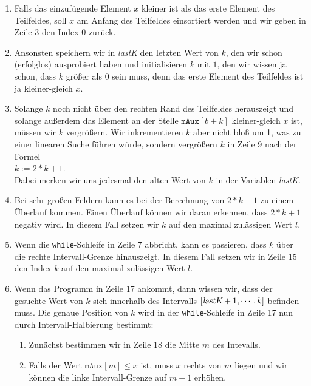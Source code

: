 \begin{enumerate}
\item Falls das einzuf\"ugende Element $x$ kleiner ist als das erste Element des Teilfeldes,
      soll $x$ am Anfang des Teilfeldes einsortiert werden und wir geben in Zeile
      3 den Index 0 zur\"uck.
\item Ansonsten speichern wir in \textsl{lastK} den letzten Wert von $k$, den wir schon
      (erfolglos) ausprobiert haben und initialisieren $k$ mit $1$, den wir wissen ja schon,
      dass $k$ gr\"o{\ss}er als $0$ sein muss, denn das erste Element des Teilfeldes ist ja kleiner-gleich
      $x$.
\item Solange $k$ noch nicht \"uber den rechten Rand des Teilfeldes herauszeigt und solange au{\ss}erdem
      das Element an der Stelle $\mathtt{mAux}[b + k]$ kleiner-gleich $x$ ist, m\"ussen wir $k$ vergr\"o{\ss}ern.
      Wir inkrementieren $k$ aber nicht blo{\ss} um 1, was zu einer linearen Suche f\"uhren w\"urde, sondern
      vergr\"o{\ss}ern $k$ in Zeile 9 nach der Formel
      \\[0.2cm]
      \hspace*{1.3cm}
      $k := 2 * k + 1$.
      \\[0.2cm]
      Dabei merken wir uns jedesmal den alten Wert von $k$ in der Variablen \textsl{lastK}.
\item Bei sehr gro{\ss}en Feldern kann es bei der Berechnung von $2 * k + 1$ zu einem
      Überlauf kommen.  Einen Überlauf k\"onnen wir daran erkennen, dass $2 * k + 1$ negativ wird.
      In diesem Fall setzen wir $k$ auf den maximal zul\"assigen Wert $l$.
\item Wenn die \texttt{while}-Schleife in Zeile 7 abbricht, kann es passieren, dass $k$ \"uber die
      rechte Intervall-Grenze 
      hinauszeigt.  In diesem Fall setzen wir in Zeile 15 den Index $k$ auf den maximal zul\"assigen Wert $l$.
\item Wenn das Programm in Zeile 17 ankommt, dann wissen wir, dass der gesuchte Wert von $k$ sich
      innerhalb des Intervalls $[\textsl{lastK}+ 1, \cdots, k]$ befinden muss.  Die genaue Position
      von $k$ wird in der \texttt{while}-Schleife in Zeile 17 nun durch Intervall-Halbierung
      bestimmt:
      \begin{enumerate}
      \item Zun\"achst bestimmen wir in Zeile 18 die Mitte $m$ des Intevalls.
      \item Falls der Wert $\mathtt{mAux}[m] \leq x$ ist, muss $x$ rechts von $m$ liegen
            und wir k\"onnen die linke Intervall-Grenze auf $m+1$ erh\"ohen.

\end{enumerate}
\end{enumerate}
